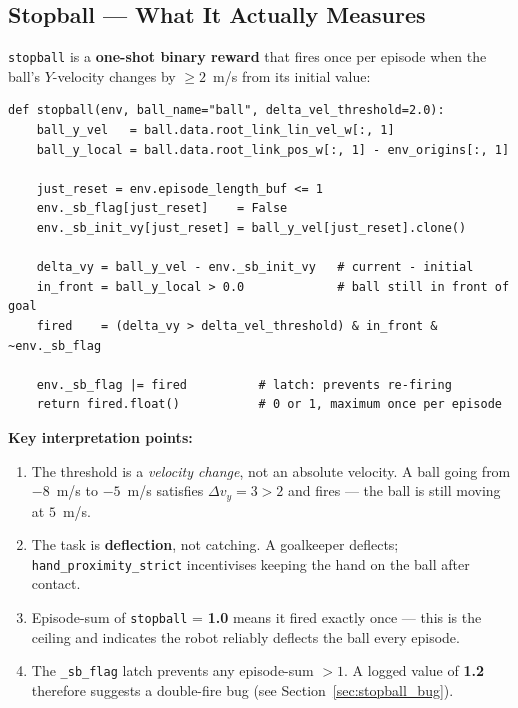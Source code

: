 \documentclass[11pt,a4paper]{article}
\begin{document}
\subsection{Stopball --- What It Actually Measures}
\label{subsec:stopball}

\texttt{stopball} is a \textbf{one-shot binary reward} that fires once per episode
when the ball's $Y$-velocity changes by $\geq 2$~m/s from its initial value:

\begin{lstlisting}[caption={stopball reward (MJLab port, \texttt{mdp/rewards.py})}]
def stopball(env, ball_name="ball", delta_vel_threshold=2.0):
    ball_y_vel   = ball.data.root_link_lin_vel_w[:, 1]
    ball_y_local = ball.data.root_link_pos_w[:, 1] - env_origins[:, 1]

    just_reset = env.episode_length_buf <= 1
    env._sb_flag[just_reset]    = False
    env._sb_init_vy[just_reset] = ball_y_vel[just_reset].clone()

    delta_vy = ball_y_vel - env._sb_init_vy   # current - initial
    in_front = ball_y_local > 0.0             # ball still in front of goal
    fired    = (delta_vy > delta_vel_threshold) & in_front & ~env._sb_flag

    env._sb_flag |= fired          # latch: prevents re-firing
    return fired.float()           # 0 or 1, maximum once per episode
\end{lstlisting}

\textbf{Key interpretation points:}

\begin{enumerate}[nosep]
  \item The threshold is a \emph{velocity change}, not an absolute velocity.
        A ball going from $-8$~m/s to $-5$~m/s satisfies $\Delta v_y = 3 > 2$
        and fires --- the ball is still moving at $5$~m/s.
  \item The task is \textbf{deflection}, not catching. A goalkeeper deflects;
        \texttt{hand\_proximity\_strict} incentivises keeping the hand on the
        ball after contact.
  \item Episode-sum of \texttt{stopball} = \textbf{1.0} means it fired exactly
        once --- this is the ceiling and indicates the robot reliably deflects
        the ball every episode.
  \item The \texttt{\_sb\_flag} latch prevents any episode-sum $> 1$.
        A logged value of \textbf{1.2} therefore suggests a double-fire bug
        (see Section~\ref{sec:stopball_bug}).
\end{enumerate}
\end{document}
